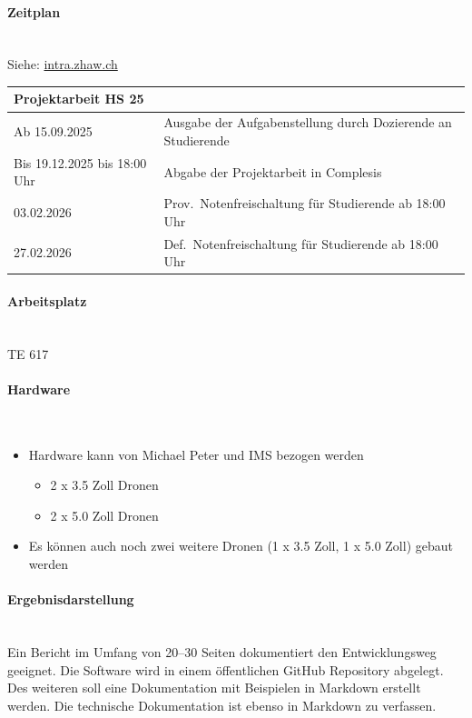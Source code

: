 \documentclass[a4paper,11pt]{scrartcl}
\begin{document}
\paragraph{Zeitplan}~\\
Siehe: \href{https://intra.zhaw.ch/departemente/school-of-engineering/bachelorstudium/projekt-und-bachelorarbeiten}{intra.zhaw.ch}

\begin{table}[H]
	\centering
	\begin{tabular}{ll}
		\toprule
		\textbf{Projektarbeit HS 25} &                                                              \\
		\midrule
		Ab 15.09.2025                & Ausgabe der Aufgabenstellung durch Dozierende an Studierende \\
		Bis 19.12.2025 bis 18:00 Uhr & Abgabe der Projektarbeit in Complesis                        \\
		03.02.2026                   & Prov.\ Notenfreischaltung für Studierende ab 18:00 Uhr       \\
		27.02.2026                   & Def.\ Notenfreischaltung für Studierende ab 18:00 Uhr        \\
		\bottomrule
	\end{tabular}
\end{table}

\paragraph{Arbeitsplatz}~\\
TE 617

\paragraph{Hardware}~\\
\begin{itemize}
	\item Hardware kann von Michael Peter und IMS bezogen werden
	      \begin{itemize}
		      \item 2 x 3.5 Zoll Dronen
		      \item 2 x 5.0 Zoll Dronen
	      \end{itemize}
	\item Es können auch noch zwei weitere Dronen (1 x 3.5 Zoll, 1 x 5.0 Zoll) gebaut werden
\end{itemize}

\paragraph{Ergebnisdarstellung}~\\
Ein Bericht im Umfang von 20--30 Seiten dokumentiert den Entwicklungsweg geeignet. Die Software wird in einem öffentlichen GitHub Repository abgelegt. Des weiteren soll eine Dokumentation mit Beispielen in Markdown erstellt werden. Die technische Dokumentation ist ebenso in Markdown zu verfassen.
\end{document}
